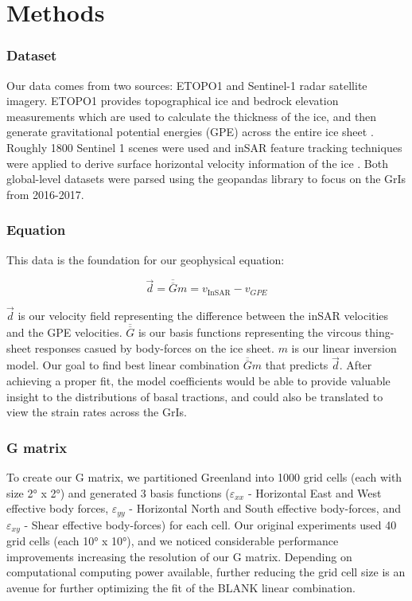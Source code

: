 \documentclass{article}
\begin{document}
\section{Methods}

\subsubsection{Dataset}
Our data comes from two sources: ETOPO1 and Sentinel-1 radar satellite imagery. ETOPO1 provides topographical ice and bedrock elevation measurements which are used to calculate the thickness of the ice, and then generate gravitational potential energies (GPE) across the entire ice sheet \cite{information ETPO1}. Roughly 1800 Sentinel 1 scenes were used and inSAR feature tracking techniques were applied to derive surface horizontal velocity information of the ice \cite{nagler SENTINEL 1}. Both global-level datasets were parsed using the geopandas library to focus on the GrIs from 2016-2017. 

\subsubsection{Equation}
This data is the foundation for our geophysical equation:

$$
\vec{d}=\overline{\overline{G}} m=v_{\text {InSAR}}-v_{GPE}
$$


$\vec{d}$ is our velocity field representing the difference between the inSAR velocities and the GPE velocities. $\overline{\overline{G}}$ is our basis functions representing the vircous thing-sheet responses casued by body-forces on the ice sheet. $m$ is our linear inversion model. Our goal to find best linear combination $\overline{\overline{G}} m$ that predicts $\vec{d}$. After achieving a proper fit, the model coefficients would be able to provide valuable insight to the distributions of basal tractions, and could also be translated to view the strain rates across the GrIs.

\subsubsection{G matrix}
To create our G matrix, we partitioned Greenland into 1000 grid cells (each with size 2° x 2°) and generated 3 basis functions ($\varepsilon_{xx}$ - Horizontal East and West effective body forces, $\varepsilon_{yy}$ - Horizontal North and South effective body-forces, and $\varepsilon_{xy}$ - Shear effective body-forces) for each cell. Our original experiments used 40 grid cells (each 10° x 10°), and we noticed considerable performance improvements increasing the resolution of our G matrix. Depending on computational computing power available, further reducing the grid cell size is an avenue for further optimizing the fit of the BLANK linear combination.   
\end{document}
